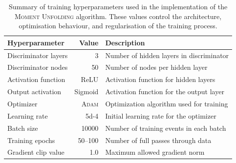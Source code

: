 \begin{table}
\centering
\caption[\textsc{Moment Unfolding:} Summary of hyperparameters.]{Summary of training hyperparameters used in the implementation of the \textsc{Moment Unfolding} algorithm. These values control the architecture, optimisation behaviour, and regularisation of the training process.}
\label{tab:moment-unfolding-hyperparams}
\begin{tabular}{@{}lrl@{}}
\toprule
\textbf{Hyperparameter} & \textbf{Value} & \textbf{Description} \\
\midrule
Discriminator layers     & 3                  & Number of hidden layers in discriminator \\
Discriminator nodes      & 50                 & Number of nodes per hidden layer \\
Activation function      & ReLU               & Activation function for hidden layers \\
Output activation        & Sigmoid            & Activation function for the output layer \\
Optimizer                & \textsc{Adam}      & Optimization algorithm used for training \\
Learning rate            & \num{5d-4} & Initial learning rate for the optimizer \\
Batch size              & \num{10000}             & Number of training events in each batch \\
Training epochs          & \numrange{50}{100}            & Number of full passes through data \\
Gradient clip value      & 1.0                & Maximum allowed gradient norm \\
\bottomrule
\end{tabular}
\end{table}